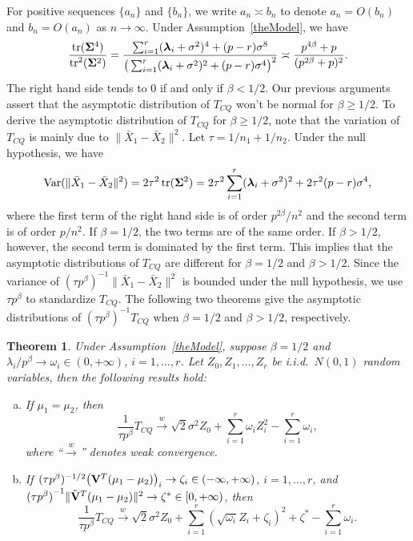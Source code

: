 \documentclass[review]{elsarticle}
\DeclareMathOperator{\mytr}{tr}
\DeclareMathOperator{\myVar}{Var}
\newcommand{\bfsym}[1]{\ensuremath{\boldsymbol{#1}}}
\def\blambda {\bfsym {\lambda}}        \def\bLambda {\bfsym {\Lambda}}
\theoremstyle{plain}
\newtheorem{theorem}{\quad\quad Theorem}
\theoremstyle{definition}
\theoremstyle{remark}
\begin{document}
For positive sequences $\{a_n\}$ and $\{b_n\}$, we write $a_n\asymp b_n$ to denote $a_n=O(b_n)$ and $b_n=O(a_n)$ as $n\to \infty$.
Under Assumption~\ref{theModel}, we have
$$
\frac{\mytr(\bSigma^4)}{\mytr^2(\bSigma^2)}=
\frac{\sum_{i=1}^r (\blambda_i+\sigma^2)^4+(p-r)\sigma^8}{\big(\sum_{i=1}^r (\blambda_i+\sigma^2)^2+(p-r)\sigma^4\big)^2}\asymp \frac{p^{4\beta}+p}{(p^{2\beta}+p)^2}.
$$
The right hand side tends to $0$ if and only if $\beta<1/2$.
Our previous arguments assert that the asymptotic distribution of $T_{CQ}$ won't be normal for $\beta\geq 1/2$.
To derive the asymptotic distribution of $T_{CQ}$ for $\beta\geq 1/2$,
note that the variation of $T_{CQ}$ is mainly due to $\|\bar{X}_1-\bar{X}_2\|^2$.
Let $\tau=1/n_1+1/n_2$.
Under the null hypothesis, we have
$$
\myVar(\|\bar{X}_1-\bar{X}_2\|^2)=
2\tau^2 \mytr (\bSigma^2)=2\tau^2 \sum_{i=1}^r (\blambda_i+
\sigma^2)^2
+ 2\tau^2 (p-r)\sigma^4,
$$
where the first term of the right hand side is of order $p^{2\beta}/n^2$ and the second term is of order $p/n^2$.
If $\beta=1/2$, the two terms are of the same order. 
If $\beta>1/2$, however, the second term is dominated by the first term.
This implies that the asymptotic distributions of $T_{CQ}$ are different for $\beta=1/2$ and $\beta>1/2$.
Since the variance of $(\tau p^{\beta})^{-1}\|\bar{X}_1-\bar{X}_2\|^2$ is bounded under the null hypothesis, we use $\tau p^{\beta}$ to standardize $T_{CQ}$.
The following two theorems give the asymptotic distributions of $(\tau p^{\beta})^{-1}T_{CQ}$ when $\beta= 1/2$ and $\beta>1/2$, respectively.
\begin{theorem}\label{Chenstheory1}
 Under Assumption~\ref{theModel},
    suppose $\beta=1/2$ and $\lambda_i/p^\beta \to \omega_i\in(0,+\infty)$, $i=1,\ldots,r$.
    Let $Z_{0},Z_1,\ldots,Z_{r}$ be i.i.d.\ $N(0,1)$ random variables,
     then the following results hold:
     \begin{enumerate}[(a)]
         \item
             If $\mu_1=\mu_2$, then
    $$
        \frac{1}{\tau p^{\beta}} T_{CQ}
        \xrightarrow{w}
\sqrt{2}\sigma^2 Z_0
+
        \sum_{i=1}^r \omega_i Z_i^2
            -
        \sum_{i=1}^r \omega_i,
    $$
             where ``$\xrightarrow{w}$'' denotes weak convergence.
         \item
             If $(\tau p^{\beta})^{-1/2}\big(\mathbf{V}^T (\mu_1-\mu_2)\big)_i\to \zeta_i\in(-\infty,+\infty)$, $i=1,\ldots,r$,
             and
    ${(\tau p^\beta)}^{-1}\|\tilde{\mathbf{V}}^T (\mu_1-\mu_2)\|^2\to \zeta^*\in [0,+\infty)$, then
    $$
        \frac{1}{\tau p^{\beta}} T_{CQ}
        \xrightarrow{w}
\sqrt{2}\sigma^2 Z_0+
        \sum_{i=1}^r (\sqrt{\omega_i} Z_i+\zeta_i)^2+
\zeta^*
        -
        \sum_{i=1}^r \omega_i.
    $$
     \end{enumerate}
\end{theorem}
\end{document}

